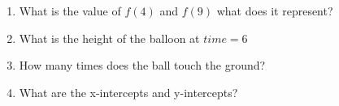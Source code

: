 \documentclass{article}
\begin{document}
\begin{enumerate}[label=\textbf{\arabic*.}]
\begin{center}
\begin{tabular}{ |c|c|c|c|c|c|c|c|c|c|c|c| }
\end{tabular}
\end{center}
\begin{enumerate}[label=\textbf{\alph*.}]
    \item What is the value of $f(4)$ and $f(9)$ what does it represent?
    \vspace{1.25cm}
    \item What is the height of the balloon at $time=6$
    \vspace{1.25cm}
    \item How many times does the ball touch the ground?  
    \vspace{1.25cm}
    \item What are the x-intercepts and y-intercepts?
\end{enumerate}
\end{enumerate}
\end{document}

